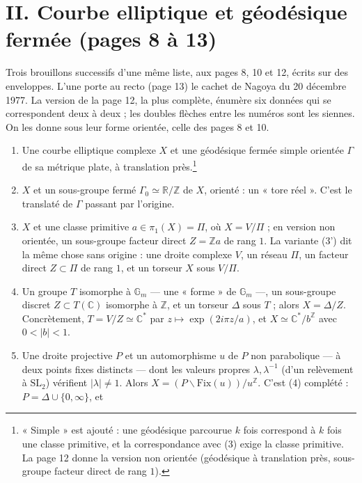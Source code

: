 \documentclass[11pt,a4paper]{article}
\begin{document}
\section*{II. Courbe elliptique et géodésique fermée (pages 8 à 13)}

Trois brouillons successifs d'une même liste, aux pages 8, 10 et 12, écrits
sur des enveloppes. L'une porte au recto (page 13) le cachet de Nagoya du 20
décembre 1977. La version de la page 12, la plus complète, énumère six
données qui se correspondent deux à deux ; les doubles flèches entre les
numéros sont les siennes. On les donne sous leur forme orientée, celle des
pages 8 et 10.

\begin{enumerate}
  \item Une courbe elliptique complexe $X$ et une géodésique fermée simple
  orientée $\Gamma$ de sa métrique plate, à translation près.\footnote{« Simple »
  est ajouté : une géodésique parcourue $k$ fois correspond à $k$ fois une
  classe primitive, et la correspondance avec (3) exige la classe primitive.
  La page 12 donne la version non orientée (géodésique à translation près,
  sous-groupe facteur direct de rang $1$).}
  \item $X$ et un sous-groupe fermé $\Gamma_0 \simeq \mathbb{R}/\mathbb{Z}$
  de $X$, orienté : un « tore réel ». C'est le translaté de $\Gamma$ passant
  par l'origine.
  \item $X$ et une classe primitive $a \in \pi_1(X) = \Pi$, où
  $X = V/\Pi$ ; en version non orientée, un sous-groupe facteur direct
  $Z = \mathbb{Z}a$ de rang $1$. La variante (3') dit la même chose sans
  origine : une droite complexe $V$, un réseau $\Pi$, un facteur direct
  $Z \subset \Pi$ de rang $1$, et un torseur $X$ sous $V/\Pi$.
  \item Un groupe $T$ isomorphe à $\mathbb{G}_m$ --- une « forme » de
  $\mathbb{G}_m$ ---, un sous-groupe discret $Z \subset T(\mathbb{C})$
  isomorphe à $\mathbb{Z}$, et un torseur $\Delta$ sous $T$ ; alors
  $X = \Delta/Z$. Concrètement, $T = V/Z \simeq \mathbb{C}^{*}$ par
  $z \mapsto \exp(2i\pi z/a)$, et $X \simeq \mathbb{C}^{*}/b^{\mathbb{Z}}$
  avec $0 < |b| < 1$.
  \item Une droite projective $P$ et un automorphisme $u$ de $P$ non
  parabolique --- à deux points fixes distincts --- dont les valeurs propres
  $\lambda, \lambda^{-1}$ (d'un relèvement à $\mathrm{SL}_2$) vérifient
  $|\lambda| \neq 1$. Alors $X = (P \smallsetminus \mathrm{Fix}(u))/
  u^{\mathbb{Z}}$. C'est (4) complété : $P = \Delta \cup \{0, \infty\}$, et

\end{enumerate}
\end{document}
